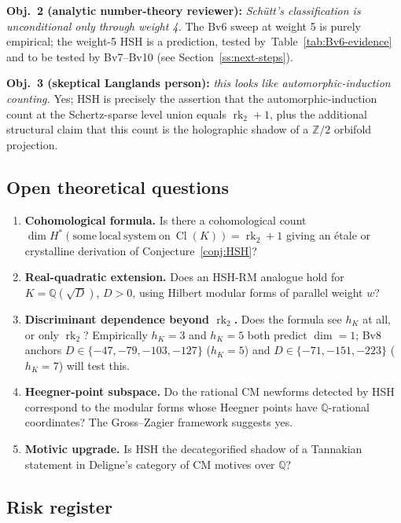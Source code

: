 \documentclass[11pt,a4paper]{amsart}
\theoremstyle{definition}
\DeclareMathOperator{\Cl}{Cl}
\DeclareMathOperator{\rk}{rk}
\newcommand{\Q}{\mathbb{Q}}
\newcommand{\Z}{\mathbb{Z}}
\newcommand{\rktwo}{\rk_{2}}
\begin{document}
\textbf{Obj.\ 2 (analytic number-theory reviewer):} \emph{Sch\"utt's classification is
unconditional only through weight 4.} The Bv6 sweep at weight 5 is purely empirical; the
weight-5 HSH is a prediction, tested by~Table~\ref{tab:Bv6-evidence} and to be tested by
Bv7--Bv10 (see Section~\ref{ss:next-steps}).

\textbf{Obj.\ 3 (skeptical Langlands person):} \emph{this looks like automorphic-induction
counting.} Yes; HSH is precisely the assertion that the automorphic-induction count at
the Schertz-sparse level union equals $\rktwo + 1$, plus the additional structural
claim that this count is the holographic shadow of a $\Z/2$ orbifold projection.

\subsection{Open theoretical questions}\label{ss:openQ}

\begin{enumerate}[label=Q\arabic*.,leftmargin=*]
\item \textbf{Cohomological formula.} Is there a cohomological count
$\dim H^*(\mathrm{some\ local\ system\ on\ }\Cl(K)) = \rktwo + 1$ giving an \'etale or
crystalline derivation of Conjecture~\ref{conj:HSH}?
\item \textbf{Real-quadratic extension.} Does an HSH-RM analogue hold for $K = \Q(\sqrt{D})$,
$D > 0$, using Hilbert modular forms of parallel weight $w$?
\item \textbf{Discriminant dependence beyond $\rktwo$.} Does the formula see $h_K$ at all,
or only $\rktwo$? Empirically $h_K = 3$ and $h_K = 5$ both predict $\dim = 1$;
Bv8 anchors $D \in \{-47, -79, -103, -127\}$ ($h_K = 5$) and $D \in \{-71, -151, -223\}$
($h_K = 7$) will test this.
\item \textbf{Heegner-point subspace.} Do the rational CM newforms detected by HSH
correspond to the modular forms whose Heegner points have $\Q$-rational coordinates?
The Gross--Zagier framework suggests yes.
\item \textbf{Motivic upgrade.} Is HSH the decategorified shadow of a Tannakian statement
in Deligne's category of CM motives over $\Q$?
\end{enumerate}

\subsection{Risk register}\label{ss:risks}
\end{document}
